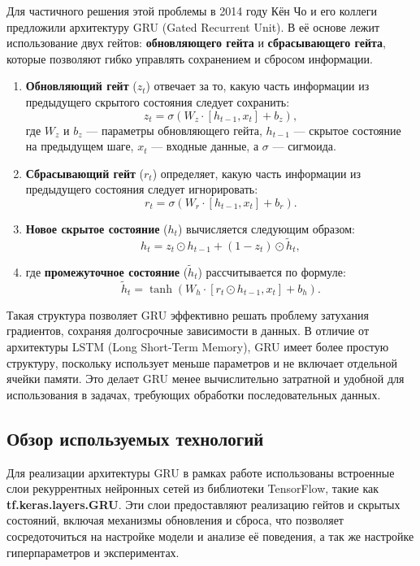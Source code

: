 Для частичного решения этой проблемы в 2014 году Кён Чо и его коллеги предложили архитектуру GRU (Gated Recurrent Unit). В её основе лежит использование двух гейтов: \textbf{обновляющего гейта} и \textbf{сбрасывающего гейта}, которые позволяют гибко управлять сохранением и сбросом информации.
\begin{enumerate}
\item \textbf{Обновляющий гейт} (\( z_t \)) отвечает за то, какую часть информации из предыдущего скрытого состояния следует сохранить:
  \[
  z_t = \sigma(W_z \cdot [h_{t-1}, x_t] + b_z),
  \]
  где \( W_z \) и \( b_z \) --- параметры обновляющего гейта, \( h_{t-1} \) --- скрытое состояние на предыдущем шаге, \( x_t \) --- входные данные, а \( \sigma \) --- сигмоида.

\item \textbf{Сбрасывающий гейт} (\( r_t \)) определяет, какую часть информации из предыдущего состояния следует игнорировать:
  \[
  r_t = \sigma(W_r \cdot [h_{t-1}, x_t] + b_r).
  \]

\item \textbf{Новое скрытое состояние} (\( h_t \)) вычисляется следующим образом:
\[
h_t = z_t \odot h_{t-1} + (1 - z_t) \odot \tilde{h}_t,
\]
\item где \textbf{промежуточное состояние} (\( \tilde{h}_t \)) рассчитывается по формуле:
\[
\tilde{h}_t = \tanh(W_h \cdot [r_t \odot h_{t-1}, x_t] + b_h).
\]
\end{enumerate}

Такая структура позволяет GRU эффективно решать проблему затухания градиентов, сохраняя долгосрочные зависимости в данных. В отличие от архитектуры LSTM (Long Short-Term Memory), GRU имеет более простую структуру, поскольку использует меньше параметров и не включает отдельной ячейки памяти. Это делает GRU менее вычислительно затратной и удобной для использования в задачах, требующих обработки последовательных данных.

\subsection{Обзор используемых технологий}
Для реализации архитектуры GRU в рамках работе использованы встроенные слои рекуррентных нейронных сетей из библиотеки TensorFlow, такие как \textbf{tf.keras.layers.GRU}. Эти слои предоставляют реализацию гейтов и скрытых состояний, включая механизмы обновления и сброса, что позволяет сосредоточиться на настройке модели и анализе её поведения, а так же настройке гиперпараметров и экспериментах.


